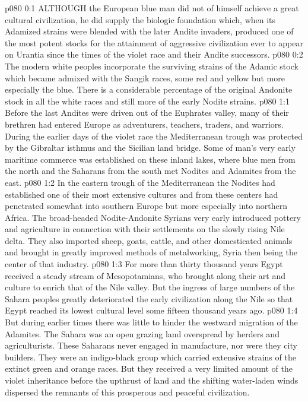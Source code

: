 \vs p080 0:1 ALTHOUGH the European blue man did not of himself achieve a great cultural civilization, he did supply the biologic foundation which, when its Adamized strains were blended with the later Andite invaders, produced one of the most potent stocks for the attainment of aggressive civilization ever to appear on Urantia since the times of the violet race and their Andite successors.
\vs p080 0:2 The modern white peoples incorporate the surviving strains of the Adamic stock which became admixed with the Sangik races, some red and yellow but more especially the blue. There is a considerable percentage of the original Andonite stock in all the white races and still more of the early Nodite strains.
\vs p080 1:1 Before the last Andites were driven out of the Euphrates valley, many of their brethren had entered Europe as adventurers, teachers, traders, and warriors. During the earlier days of the violet race the Mediterranean trough was protected by the Gibraltar isthmus and the Sicilian land bridge. Some of man’s very early maritime commerce was established on these inland lakes, where blue men from the north and the Saharans from the south met Nodites and Adamites from the east.
\vs p080 1:2 In the eastern trough of the Mediterranean the Nodites had established one of their most extensive cultures and from these centers had penetrated somewhat into southern Europe but more especially into northern Africa. The broad\hyp{}headed Nodite\hyp{}Andonite Syrians very early introduced pottery and agriculture in connection with their settlements on the slowly rising Nile delta. They also imported sheep, goats, cattle, and other domesticated animals and brought in greatly improved methods of metalworking, Syria then being the center of that industry.
\vs p080 1:3 For more than thirty thousand years Egypt received a steady stream of Mesopotamians, who brought along their art and culture to enrich that of the Nile valley. But the ingress of large numbers of the Sahara peoples greatly deteriorated the early civilization along the Nile so that Egypt reached its lowest cultural level some fifteen thousand years ago.
\vs p080 1:4 But during earlier times there was little to hinder the westward migration of the Adamites. The Sahara was an open grazing land overspread by herders and agriculturists. These Saharans never engaged in manufacture, nor were they city builders. They were an indigo\hyp{}black group which carried extensive strains of the extinct green and orange races. But they received a very limited amount of the violet inheritance before the upthrust of land and the shifting water\hyp{}laden winds dispersed the remnants of this prosperous and peaceful civilization.
